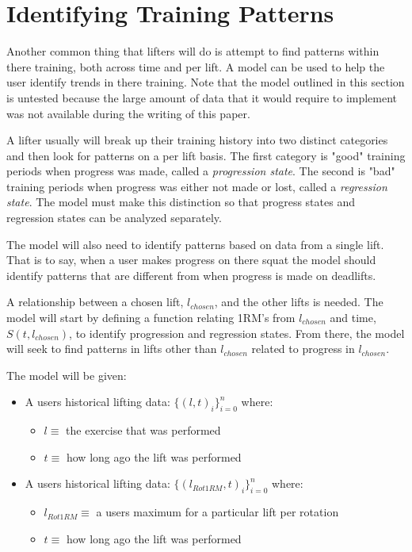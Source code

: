\section{Identifying Training Patterns}

Another common thing that lifters will do is attempt to find patterns within there training, both across time and per lift. A model can be used to help the user identify trends in there training. Note that the model outlined in this section is untested because the large amount of data that it would require to implement was not available during the writing of this paper.

A lifter usually will break up their training history into two distinct categories and then look for patterns on a per lift basis. The first category is "good" training periods when progress was made, called a \textit{progression state}. The second is "bad" training periods when progress was either not made or lost, called a \textit{regression state}. The model must make this distinction so that progress states and regression states can be analyzed separately. 

The model will also need to identify patterns based on data from a single lift. That is to say, when a user makes progress on there squat the model should identify patterns that are different from when progress is made on deadlifts.

A relationship between a chosen lift, $l_{chosen}$, and the other lifts is needed. The model will start by defining a function relating 1RM's from $l_{chosen}$ and time, $S(t,l_{chosen})$, to identify progression and regression states. From there, the model will seek to find patterns in lifts other than $l_{chosen}$ related to progress in $l_{chosen}$.

The model will be given:
\begin{itemize}
    \item A users historical lifting data: $\{(l,t)_i\}_{i=0}^n$ where:
    \begin{itemize}
        \item $l \equiv$ the exercise that was performed
        \item $t \equiv$ how long ago the lift was performed
    \end{itemize}
    \item A users historical lifting data: $\{(l_{Rot1RM},t)_i\}_{i=0}^n$ where:
    \begin{itemize}
        \item $l_{Rot1RM} \equiv$ a users maximum for a particular lift per rotation
        \item $t \equiv$ how long ago the lift was performed
    \end{itemize}
\end{itemize}


